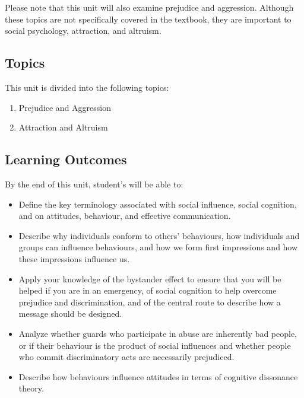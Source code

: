 \documentclass[
]{book}
\providecommand{\tightlist}{%
  \setlength{\itemsep}{0pt}\setlength{\parskip}{0pt}}
\begin{document}
Please note that this unit will also examine prejudice and aggression. Although these topics are not specifically covered in the textbook, they are important to social psychology, attraction, and altruism.

\hypertarget{topics-6}{%
\subsection*{Topics}\label{topics-6}}

This unit is divided into the following topics:

\begin{enumerate}
\def\labelenumi{\arabic{enumi}.}
\tightlist
\item
  Prejudice and Aggression\\
\item
  Attraction and Altruism
\end{enumerate}

\hypertarget{learning-outcomes-6}{%
\subsection*{Learning Outcomes}\label{learning-outcomes-6}}

By the end of this unit, student's will be able to:

\begin{itemize}
\tightlist
\item
  Define the key terminology associated with social influence, social cognition, and on attitudes, behaviour, and effective communication.\\
\item
  Describe why individuals conform to others' behaviours, how individuals and groups can influence behaviours, and how we form first impressions and how these impressions influence us.\\
\item
  Apply your knowledge of the bystander effect to ensure that you will be helped if you are in an emergency, of social cognition to help overcome prejudice and discrimination, and of the central route to describe how a message should be designed.\\
\item
  Analyze whether guards who participate in abuse are inherently bad people, or if their behaviour is the product of social influences and whether people who commit discriminatory acts are necessarily prejudiced.\\
\item
  Describe how behaviours influence attitudes in terms of cognitive dissonance theory.
\end{itemize}
\end{document}
